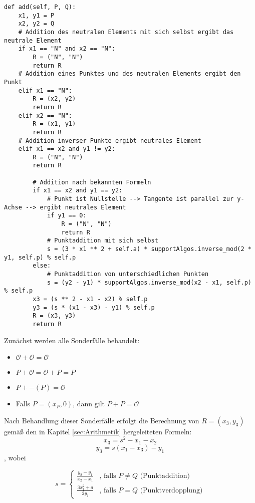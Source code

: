 \vspace{\baselineskip}
\begin{lstlisting}[caption={Methode: add()}, captionpos=b]
def add(self, P, Q):
    x1, y1 = P
    x2, y2 = Q
    # Addition des neutralen Elements mit sich selbst ergibt das neutrale Element
    if x1 == "N" and x2 == "N":
        R = ("N", "N")
        return R
    # Addition eines Punktes und des neutralen Elements ergibt den Punkt
    elif x1 == "N":
        R = (x2, y2)
        return R
    elif x2 == "N":
        R = (x1, y1)
        return R
    # Addition inverser Punkte ergibt neutrales Element
    elif x1 == x2 and y1 != y2:
        R = ("N", "N")
        return R

        # Addition nach bekannten Formeln
        if x1 == x2 and y1 == y2:
            # Punkt ist Nullstelle --> Tangente ist parallel zur y-Achse --> ergibt neutrales Element
            if y1 == 0:
                R = ("N", "N")
                return R
            # Punktaddition mit sich selbst
            s = (3 * x1 ** 2 + self.a) * supportAlgos.inverse_mod(2 * y1, self.p) % self.p
        else:
            # Punktaddition von unterschiedlichen Punkten
            s = (y2 - y1) * supportAlgos.inverse_mod(x2 - x1, self.p) % self.p
        x3 = (s ** 2 - x1 - x2) % self.p
        y3 = (s * (x1 - x3) - y1) % self.p
        R = (x3, y3)
        return R
\end{lstlisting}
\vspace{\baselineskip}
Zunächst werden alle Sonderfälle behandelt:
\begin{itemize}
\item $\mathcal{O} + \mathcal{O} = \mathcal{O}$
\item $P + \mathcal{O} = \mathcal{O} + P = P$
\item $P + -(P) = \mathcal{O}$
\item Falls $P = (x_P, 0)$, dann gilt $P + P = \mathcal{O}$
\end{itemize}
Nach Behandlung dieser Sonderfälle erfolgt die Berechnung von $R = (x_3, y_3)$ gemäß den in Kapitel \ref{sec:Arithmetik} hergeleiteten Formeln:
$$x_3 = s^2 - x_1 - x_2$$
$$y_3 = s(x_1 - x_3) - y_1$$,
wobei

$$s = \begin{cases}
	\frac{y_2 - y_1}{x_2 -x_1} & \text{, falls } P \neq Q \text{ (Punktaddition)}\\
	\frac{3x_1^2 + a}{2y_1} & \text{, falls } P = Q \text{ (Punktverdopplung)}
	\end{cases}
$$
\vspace{\baselineskip}

